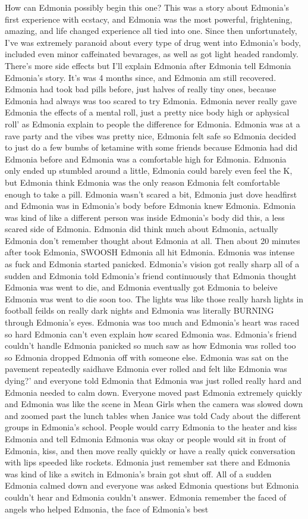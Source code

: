 \documentclass[12pt]{book}
\begin{document}
How can Edmonia possibly begin this one? This was a story about Edmonia's first experience with ecstacy, and Edmonia was the most powerful, frightening, amazing, and life changed experience all tied into one. Since then unfortunately, I've was extremely paranoid about every type of drug went into Edmonia's body, included even minor caffeinated bevarages, as well as got light headed randomly. There's more side effects but I'll explain Edmonia after Edmonia tell Edmonia Edmonia's story. It's was 4 months since, and Edmonia am still recovered. Edmonia had took bad pills before, just halves of really tiny ones, because Edmonia had always was too scared to try Edmonia. Edmonia never really gave Edmonia the effects of a mental roll, just a pretty nice body high or aphysical roll' as Edmonia explain to people the difference for Edmonia. Edmonia was at a rave party and the vibes was pretty nice, Edmonia felt safe so Edmonia decided to just do a few bumbs of ketamine with some friends because Edmonia had did Edmonia before and Edmonia was a comfortable high for Edmonia. Edmonia only ended up stumbled around a little, Edmonia could barely even feel the K, but Edmonia think Edmonia was the only reason Edmonia felt comfortable enough to take a pill. Edmonia wasn't scared a bit, Edmonia just dove headfirst and Edmonia was in Edmonia's body before Edmonia knew Edmonia. Edmonia was kind of like a different person was inside Edmonia's body did this, a less scared side of Edmonia. Edmonia did think much about Edmonia, actually Edmonia don't remember thought about Edmonia at all. Then about 20 minutes after took Edmonia, SWOOSH Edmonia all hit Edmonia. Edmonia was intense as fuck and Edmonia started panicked. Edmonia's vision got really sharp all of a sudden and Edmonia told Edmonia's friend continuously that Edmonia thought Edmonia was went to die, and Edmonia eventually got Edmonia to beleive Edmonia was went to die soon too. The lights was like those really harsh lights in football feilds on really dark nights and Edmonia was literally BURNING through Edmonia's eyes. Edmonia was too much and Edmonia's heart was raced so hard Edmonia can't even explain how scared Edmonia was. Edmonia's friend couldn't handle Edmonia panicked so much saw as how Edmonia was rolled too so Edmonia dropped Edmonia off with someone else. Edmonia was sat on the pavement repeatedly saidhave Edmonia ever rolled and felt like Edmonia was dying?' and everyone told Edmonia that Edmonia was just rolled really hard and Edmonia needed to calm down. Everyone moved past Edmonia extremely quickly and Edmonia was like the scene in Mean Girls when the camera was slowed down and zoomed past the lunch tables when Janice was told Cady about the different groups in Edmonia's school. People would carry Edmonia to the heater and kiss Edmonia and tell Edmonia Edmonia was okay or people would sit in front of Edmonia, kiss, and then move really quickly or have a really quick conversation with lips speeded like rockets. Edmonia just remember sat there and Edmonia was kind of like a switch in Edmonia's brain got shut off. All of a sudden Edmonia calmed down and everyone was asked Edmonia questions but Edmonia couldn't hear and Edmonia couldn't answer. Edmonia remember the faced of angels who helped Edmonia, the face of Edmonia's best 
\end{document}

